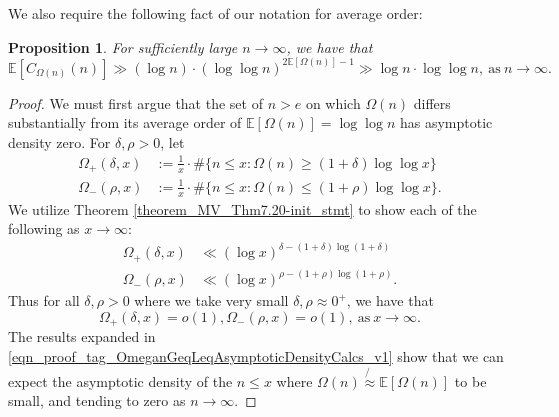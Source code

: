 \documentclass[11pt,reqno,a4letter]{article}
\numberwithin{figure}{section}
\numberwithin{table}{section}
\theoremstyle{plain}
\newtheorem{prop}[theorem]{Proposition}
\numberwithin{theorem}{section}
\theoremstyle{definition}
\begin{document}
We also require the following fact of our notation for average order: 

\begin{prop} 
\label{prop_factA_stmt_v1} 
For sufficiently large $n \rightarrow \infty$, we have that 
$$\mathbb{E}[C_{\Omega(n)}(n)] \gg (\log n) \cdot (\log\log n)^{2\mathbb{E}[\Omega(n)]-1} \gg 
  \log n \cdot \log\log n, \mathrm{\ as\ } n \rightarrow \infty.$$
\end{prop} 
\begin{proof} 
We must first argue that the set of $n > e$ on which $\Omega(n)$ differs substantially 
from its average order of $\mathbb{E}[\Omega(n)] = \log\log n$ has asymptotic density zero. 
For $\delta, \rho > 0$, let 
\begin{align*} 
\Omega_{+}(\delta, x) & := \frac{1}{x} \cdot \#\{n \leq x: \Omega(n) \geq (1+\delta) \log\log x\} \\ 
\Omega_{-}(\rho, x) & := \frac{1}{x} \cdot \#\{n \leq x: \Omega(n) \leq (1+\rho) \log\log x\}. 
\end{align*} 
We utilize Theorem \ref{theorem_MV_Thm7.20-init_stmt} 
to show each of the following as $x \rightarrow \infty$: 
\begin{align*} 
\Omega_{+}(\delta, x) & \ll (\log x)^{\delta - (1+\delta)\log(1+\delta)} \\ 
\Omega_{-}(\rho, x) & \ll (\log x)^{\rho - (1+\rho)\log(1+\rho)}. 
\end{align*} 
Thus for all $\delta, \rho > 0$ where we take very small 
$\delta, \rho \approx 0^{+}$, we have that 
\begin{equation} 
\label{eqn_proof_tag_OmeganGeqLeqAsymptoticDensityCalcs_v1} 
\Omega_{+}(\delta, x) = o(1), \Omega_{-}(\rho, x) = o(1), \mathrm{\ as\ } x \rightarrow \infty. 
\end{equation} 
The results expanded in 
\eqref{eqn_proof_tag_OmeganGeqLeqAsymptoticDensityCalcs_v1} show that we can expect the 
asymptotic density of the $n \leq x$ where $\Omega(n) \not{\approx} \mathbb{E}[\Omega(n)]$ to be small, 
and tending to zero as $n \rightarrow \infty$. 


\end{proof}
\end{document}
